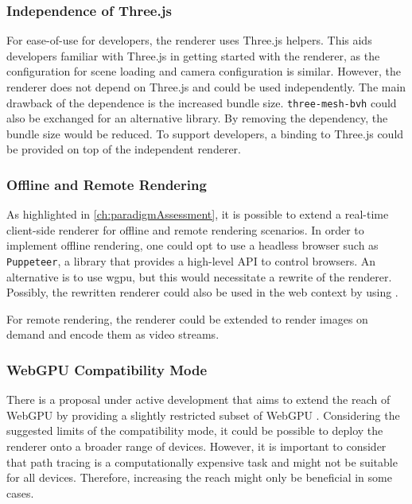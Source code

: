 \subsubsection*{Independence of Three.js}

For ease-of-use for developers, the renderer uses \gls{Three.js} helpers. This aids developers familiar with \gls{Three.js} in getting started with the renderer, as the configuration for scene loading and camera configuration is similar. However, the renderer does not depend on \gls{Three.js} and could be used independently. The main drawback of the dependence is the increased bundle size. \texttt{three-mesh-bvh} \cite{threeMeshBvh} could also be exchanged for an alternative library. By removing the dependency, the bundle size would be reduced. To support developers, a binding to \gls{Three.js} could be provided on top of the independent renderer.

\subsubsection*{Offline and Remote Rendering}

As highlighted in \autoref{ch:paradigmAssessment}, it is possible to extend a real-time client-side renderer for offline and remote rendering scenarios. In order to implement offline rendering, one could opt to use a headless browser such as \texttt{Puppeteer}, a  library that provides a high-level \gls{API} to control browsers. An alternative is to use \gls{wgpu}, but this would necessitate a rewrite of the renderer. Possibly, the rewritten renderer could also be used in the web context by using .

For remote rendering, the renderer could be extended to render images on demand and encode them as video streams.

\subsubsection*{WebGPU Compatibility Mode}

There is a proposal under active development that aims to extend the reach of \gls{WebGPU} by providing a slightly restricted subset of \gls{WebGPU} \cite{WebGPUCompatibilityModeProposal}. Considering the suggested limits of the compatibility mode, it could be possible to deploy the renderer onto a broader range of devices. However, it is important to consider that path tracing is a computationally expensive task and might not be suitable for all devices. Therefore, increasing the reach might only be beneficial in some cases.

